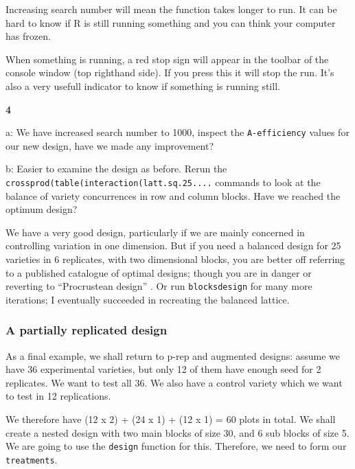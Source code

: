 \documentclass[
]{book}
\makeatletter
\newenvironment{kframe}{%
\medskip{}
\setlength{\fboxsep}{.8em}
 \def\at@end@of@kframe{}%
 \ifinner\ifhmode%
  \def\at@end@of@kframe{\end{minipage}}%
  \begin{minipage}{\columnwidth}%
 \fi\fi%
 \def\FrameCommand##1{\hskip\@totalleftmargin \hskip-\fboxsep
 \colorbox{shadecolor}{##1}\hskip-\fboxsep
     \hskip-\linewidth \hskip-\@totalleftmargin \hskip\columnwidth}%
 \MakeFramed {\advance\hsize-\width
   \@totalleftmargin\z@ \linewidth\hsize
   \@setminipage}}%
 {\par\unskip\endMakeFramed%
 \at@end@of@kframe}
\newenvironment{rmdblock}[1]
  {
  \begin{itemize}
  \renewcommand{\labelitemi}{
    \raisebox{-.7\height}[0pt][0pt]{
      {\setkeys{Gin}{width=3em,keepaspectratio}\texttt{[image: images/\#1]}}
    }
  }
  \setlength{\fboxsep}{1em}
  \begin{kframe}
  \item
  }
  {
  \end{kframe}
  \end{itemize}
  }
\newenvironment{rmdnote}
  {\begin{rmdblock}{note}}
  {\end{rmdblock}}
\newenvironment{rmdquiz}
  {\begin{rmdblock}{quiz}}
  {\end{rmdblock}}
\makeatother
\begin{document}
\begin{rmdnote}
Increasing search number will mean the function takes longer to run. It can be hard to know if R is still running something and you can think your computer has frozen.

When something is running, a red stop sign will appear in the toolbar of the console window (top righthand side). If you press this it will stop the run. It's also a very usefull indicator to know if something is running still.
\end{rmdnote}

\begin{rmdquiz}
\textbf{4}

a: We have increased search number to 1000, inspect the \texttt{A-efficiency} values for our new design, have we made any improvement?

b: Easier to examine the design as before. Rerun the \texttt{crossprod(table(interaction(latt.sq.25....} commands to look at the balance of variety concurrences in row and column blocks. Have we reached the optimum design?
\end{rmdquiz}

We have a very good design, particularly if we are mainly concerned in controlling variation in one dimension. But if you need a balanced design for 25 varieties in 6 replicates, with two dimensional blocks, you are better off referring to a published catalogue of optimal designs; though you are in danger or reverting to ``Procrustean design'' \citep{mead_design_1994}. Or run \texttt{blocksdesign} for many more iterations; I eventually succeeded in recreating the balanced lattice.

\hypertarget{a-partially-replicated-design}{%
\subsubsection{A partially replicated design}\label{a-partially-replicated-design}}

As a final example, we shall return to p-rep and augmented designs: assume we have 36 experimental varieties, but only 12 of them have enough seed for 2 replicates. We want to test all 36. We also have a control variety which we want to test in 12 replications.

We therefore have (12 x 2) + (24 x 1) + (12 x 1) = 60 plots in total. We shall create a nested design with two main blocks of size 30, and 6 sub blocks of size 5.
We are going to use the \texttt{design} function for this. Therefore, we need to form our \texttt{treatments}.
\end{document}
